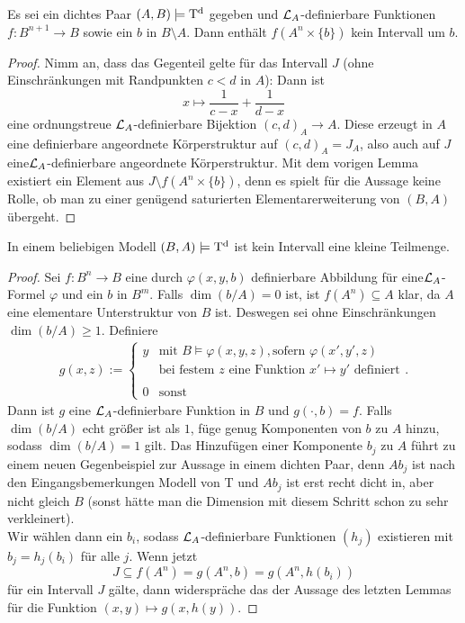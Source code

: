 \newpage

\begin{corollary}
	Es sei ein dichtes Paar $(A,B)\models\operatorname{T^d}$ gegeben und $\mathcal{L}_A$-definierbare Funktionen $f:B^{n+1}\rightarrow B$ sowie ein $b$ in $B\setminus A$. Dann enthält $f(A^n\times\{b\})$ kein Intervall um $b$.
\end{corollary}
\begin{proof}
	Nimm an, dass das Gegenteil gelte für das Intervall $J$ (ohne Einschränkungen mit Randpunkten $c<d$ in $A$): Dann ist $$x\mapsto\frac{1}{c-x}+\frac{1}{d-x}$$ eine ordnungstreue $\mathcal{L}_A$-definierbare Bijektion $(c,d)_A\rightarrow A$. Diese erzeugt in $A$ eine definierbare angeordnete Körperstruktur auf $(c,d)_A=J_A$, also auch auf $J$ eine\linebreak $\mathcal{L}_A$-definierbare angeordnete Körperstruktur. Mit dem vorigen Lemma existiert ein Element aus $J\setminus f(A^n\times\{b\})$, denn es spielt für die Aussage keine Rolle, ob man zu einer genügend saturierten Elementarerweiterung von $(B,A)$ übergeht.
\end{proof}

\begin{theorem}\label{Kleinheit}
	In einem beliebigen Modell $(B,A)\models\operatorname{T^d}$ ist kein Intervall eine kleine Teilmenge.
\end{theorem}
\begin{proof}
	Sei $f:B^n\rightarrow B$ eine durch $\varphi(x,y,b)$ definierbare Abbildung für eine\linebreak $\mathcal{L}_A$-Formel $\varphi$ und ein $b$ in $B^m$. Falls $\dim(b/A)=0$ ist, ist $f(A^n)\subseteq A$ klar, da $A$ eine elementare Unterstruktur von $B$ ist. Deswegen sei ohne Einschränkungen $\dim(b/A)\geq1$. Definiere
	\begin{align*}
	g(x,z):=\left\{\begin{array}{ll}
	y&\text{mit }B\models\varphi(x,y,z),\text{sofern }\varphi(x',y',z)\\
	&\text{bei festem }z\text{ eine Funktion }x'\mapsto y'\text{ definiert}\\
	\ &\ \\
	0 &\text{sonst}
	\end{array}\right..
	\end{align*}
	Dann ist $g$ eine $\mathcal{L}_A$-definierbare Funktion in $B$ und $g(\cdot,b)=f$. Falls $\dim(b/A)$ echt größer ist als $1$, füge genug Komponenten von $b$ zu $A$ hinzu, sodass $\dim(b/A)=1$ gilt. Das Hinzufügen einer Komponente $b_j$ zu $A$ führt zu einem neuen Gegenbeispiel zur Aussage in einem dichten Paar, denn $Ab_j$ ist nach den Eingangsbemerkungen Modell von T und $Ab_j$ ist erst recht dicht in, aber nicht gleich $B$ (sonst hätte man die Dimension mit diesem Schritt schon zu sehr verkleinert).\\
	Wir wählen dann ein $b_i$, sodass $\mathcal{L}_A$-definierbare Funktionen $(h_j)$ existieren mit\linebreak $b_j=h_j(b_i)$ für alle $j$. Wenn jetzt $$J\subseteq f(A^n)=g(A^n,b)=g(A^n,h(b_i))$$\newpage
	für ein Intervall $J$ gälte, dann widerspräche das der Aussage des letzten Lemmas für die Funktion $(x,y)\mapsto g(x,h(y))$.
\end{proof}

